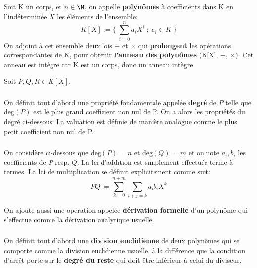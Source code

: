 \chapter*{}
Soit K un corps, et \(n \in \N\), on appelle \textbf{polynômes} à coefficients dans K en l'indéterminée \(X\) les éléments de l'ensemble:
\[
   K[X] := \Biggl\{ \; \sum_{i=0}^n a_{i}X^{i} \; ; \; a_i \in K \;\Biggl\}
\]
On adjoint à cet ensemble deux lois + et \(\times\) qui \textbf{prolongent} les opérations correspondantes de K, pour obtenir \textbf{l'anneau des polynômes} (K[X], +, \(\times\)). Cet anneau est intègre car K est un corps, donc un anneau intègre.\<

Soit \(P, Q, R \in K[X]\).

\subsection*{}
On définit tout d'abord une propriété fondamentale appelée \textbf{degré} de \(P\) telle que deg\((P)\) est le plus grand coefficient non nul de P.
On a alors les propriétés du degré ci-dessous:
La valuation est définie de manière analogue comme le plus petit coefficient non nul de P.
\subsection*{}
On considère ci-dessous que deg\((P)\) = \(n\) et deg\((Q)\) = \(m\) et on note \(a_i, b_i\) les coefficients de \(P\) resp. \(Q\).\+
La lci d'addition est simplement effectuée terme à termes.\+
La lci de multiplication se définit explicitement comme suit:
\[
   PQ := \sum_{k=0}^{n+m}\sum_{i+j = k} a_{i}b_{i}X^{k}
\]

On ajoute aussi une opération appelée \textbf{dérivation formelle} d'un polynôme qui s'effectue comme la dérivation analytique usuelle.
\subsection*{}
On définit tout d'abord une \textbf{division euclidienne} de deux polynômes qui se comporte comme la division euclidienne usuelle, à la différence que la condition d'arrêt porte sur le \textbf{degré du reste} qui doit être inférieur à celui du diviseur.\<

